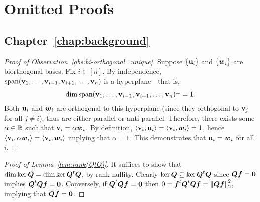 \appendix 
\chapter{Omitted Proofs}
\label{chap:app}

\section{Chapter~\ref{chap:background}}
\label{sec:app_proofs_background}


\begin{proof}[Proof  of  Observation~\ref{obs:bi-orthogonal_unique}]
	Suppose $\{\vb{u}_i\}$ and $\{\vb*{w}_i\}$ are biorthogonal bases. Fix $i\in[n]$. By independence, $\textnormal{span}(\vb{v}_1,\dots,\vb{v}_{i-1},\vb{v}_{i+1},\dots,\vb{v}_n)$ is a hyperplane---that is, \[\dim\textnormal{span}(\vb{v}_1,\dots,\vb{v}_{i-1},\vb{v}_{i+1},\dots,\vb{v}_n)^\perp=1.\] Both $\vb{u}_i$ and $\vb*{w}_i$ are orthogonal to this hyperplane (since they orthogonal to $\vb{v}_j$ for all $j\neq i$), thus are either parallel or anti-parallel. Therefore, there exists some $\alpha\in\mathbb{R}$ such that $\vb{v}_i=\alpha\vb*{w}_i$. By definition, $\langle \vb{v}_i,\vb{u}_i\rangle = \langle \vb{v}_i,\vb*{w}_i\rangle =1$, hence $\langle \vb{v}_i,\alpha \vb*{w}_i\rangle = \langle \vb{v}_i,\vb*{w}_i\rangle$ implying that $\alpha=1$. This demonstrates that $\vb{u}_i=\vb*{w}_i$ for all $i$. 
\end{proof}

\begin{proof}[Proof of Lemma~\ref{lem:rank(QtQ)}]
	It suffices to show that $\dim\ker\vb*{Q} = \dim\ker\vb*{Q}^t \vb*{Q}$, by rank-nullity. Clearly $\ker\vb*{Q} \subseteq \ker\vb*{Q}^t\vb*{Q}$ since $\vb*{Q}\vb*{f}=\vb{0}$ implies $\vb*{Q}^t\vb*{Q}\vb*{f}=\vb{0}$. Conversely, if $\vb*{Q}^t\vb*{Q}\vb*{f}=\vb{0}$ then $0=\vb*{f}^t \vb*{Q}^t \vb*{Q}\vb*{f} = \norm{\vb*{Q}\vb*{f}}_2^2$, implying that $\vb*{Q}\vb*{f}=\vb{0}$.  
\end{proof}

